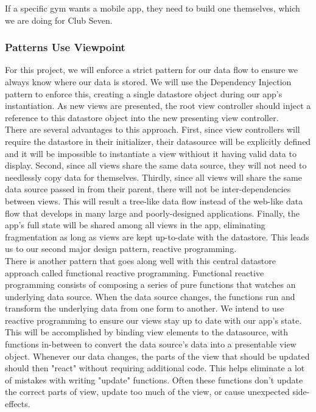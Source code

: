 \documentclass[letterpaper,10pt,titlepage]{article}
\begin{document}
If a specific gym wants a mobile app, they need to build one themselves, which we are doing for Club Seven.

\subsubsection{Patterns Use Viewpoint}
For this project, we will enforce a strict pattern for our data flow to ensure we always know where our data is stored. We will use the Dependency Injection pattern to enforce this, creating a single datastore object during our app's instantiation. As new views are presented, the root view controller should inject a reference to this datastore object into the new presenting view controller. \\

There are several advantages to this approach. First, since view controllers will require the datastore in their initializer, their datasource will be explicitly defined and it will be impossible to instantiate a view withiout it having valid data to display. Second, since all views share the same data source, they will not need to needlessly copy data for themselves. Thirdly, since all views will share the same data source passed in from their parent, there will not be inter-dependencies between views. This will result a tree-like data flow instead of the web-like data flow that develops in many large and poorly-designed applications. Finally, the app's full state will be shared among all views in the app, eliminating fragmentation as long as views are kept up-to-date with the datastore. This leads us to our second major design pattern, reactive programming. \\

There is another pattern that goes along well with this central datastore approach called functional reactive programming. Functional reactive programming consists of composing a series of pure functions that watches an underlying data source. When the data source changes, the functions run and transform the underlying data from one form to another. We intend to use reactive programming to ensure our views stay up to date with our app's state. This will be accomplished by binding view elements to the datasource, with functions in-between to convert the data source's data into a presentable view object. Whenever our data changes, the parts of the view that should be updated should then "react" without requiring additional code. This helps eliminate a lot of mistakes with writing "update" functions. Often these functions don't update the correct parts of view, update too much of the view, or cause unexpected side-effects.
\end{document}
